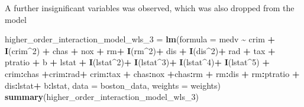 \documentclass[
]{article}
\newenvironment{Shaded}{\begin{snugshade}}{\end{snugshade}}
\newcommand{\AttributeTok}[1]{\textcolor[rgb]{0.13,0.29,0.53}{#1}}
\newcommand{\DecValTok}[1]{\textcolor[rgb]{0.00,0.00,0.81}{#1}}
\newcommand{\FunctionTok}[1]{\textcolor[rgb]{0.13,0.29,0.53}{\textbf{#1}}}
\newcommand{\NormalTok}[1]{#1}
\newcommand{\OtherTok}[1]{\textcolor[rgb]{0.56,0.35,0.01}{#1}}
\newcommand{\SpecialCharTok}[1]{\textcolor[rgb]{0.81,0.36,0.00}{\textbf{#1}}}
\begin{document}
A further insignificant variables was observed, which was also dropped
from the model

\begin{Shaded}
\begin{Highlighting}[]
\NormalTok{higher\_order\_interaction\_model\_wls\_3 }\OtherTok{=} \FunctionTok{lm}\NormalTok{(}\AttributeTok{formula =}\NormalTok{ medv }\SpecialCharTok{\textasciitilde{}}\NormalTok{ crim }\SpecialCharTok{+} \FunctionTok{I}\NormalTok{(crim}\SpecialCharTok{\^{}}\DecValTok{2}\NormalTok{) }\SpecialCharTok{+}\NormalTok{ chas }\SpecialCharTok{+}\NormalTok{ nox }\SpecialCharTok{+}\NormalTok{ rm}\SpecialCharTok{+} \FunctionTok{I}\NormalTok{(rm}\SpecialCharTok{\^{}}\DecValTok{2}\NormalTok{)}\SpecialCharTok{+}\NormalTok{ dis }\SpecialCharTok{+} \FunctionTok{I}\NormalTok{(dis}\SpecialCharTok{\^{}}\DecValTok{2}\NormalTok{)}\SpecialCharTok{+}\NormalTok{ rad }\SpecialCharTok{+}\NormalTok{ tax }\SpecialCharTok{+}\NormalTok{ ptratio }\SpecialCharTok{+}\NormalTok{ b }\SpecialCharTok{+}\NormalTok{ lstat }\SpecialCharTok{+} \FunctionTok{I}\NormalTok{(lstat}\SpecialCharTok{\^{}}\DecValTok{2}\NormalTok{)}\SpecialCharTok{+} \FunctionTok{I}\NormalTok{(lstat}\SpecialCharTok{\^{}}\DecValTok{3}\NormalTok{)}\SpecialCharTok{+} \FunctionTok{I}\NormalTok{(lstat}\SpecialCharTok{\^{}}\DecValTok{4}\NormalTok{)}\SpecialCharTok{+} \FunctionTok{I}\NormalTok{(lstat}\SpecialCharTok{\^{}}\DecValTok{5}\NormalTok{) }\SpecialCharTok{+}\NormalTok{ crim}\SpecialCharTok{:}\NormalTok{chas  }\SpecialCharTok{+}\NormalTok{crim}\SpecialCharTok{:}\NormalTok{rad}\SpecialCharTok{+}\NormalTok{ crim}\SpecialCharTok{:}\NormalTok{tax }\SpecialCharTok{+}\NormalTok{ chas}\SpecialCharTok{:}\NormalTok{nox }\SpecialCharTok{+}\NormalTok{chas}\SpecialCharTok{:}\NormalTok{rm }\SpecialCharTok{+}\NormalTok{ rm}\SpecialCharTok{:}\NormalTok{dis }\SpecialCharTok{+}\NormalTok{ rm}\SpecialCharTok{:}\NormalTok{ptratio }\SpecialCharTok{+}\NormalTok{ dis}\SpecialCharTok{:}\NormalTok{lstat}\SpecialCharTok{+}\NormalTok{ b}\SpecialCharTok{:}\NormalTok{lstat, }\AttributeTok{data =}\NormalTok{ boston\_data, }\AttributeTok{weights =}\NormalTok{ weights)}
\FunctionTok{summary}\NormalTok{(higher\_order\_interaction\_model\_wls\_3)}
\end{Highlighting}
\end{Shaded}
\end{document}
